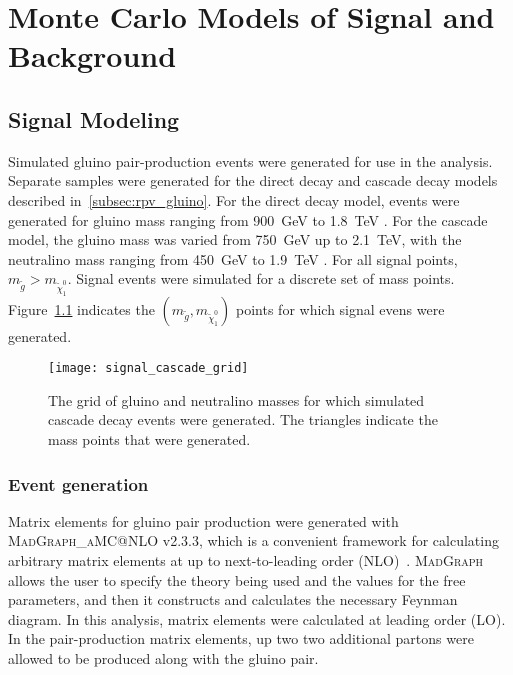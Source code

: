 \chapter{Monte Carlo Models of Signal and Background} \label{ch:monte_carlo}

\section{Signal Modeling}\label{sec:signal_modeling}

Simulated gluino pair-production events were generated for use in the analysis.
Separate samples were generated for the direct decay and cascade decay models described in~\ref{subsec:rpv_gluino}.
For the direct decay model, events were generated for gluino mass ranging from 900~GeV to 1.8~TeV .
For the cascade model, the gluino mass was varied from 750~GeV up to 2.1~TeV, with the neutralino mass ranging from
450~GeV to 1.9~TeV .
For all signal points, $m_{\tilde{g}} > m_{\tilde{\chi}_1^0}$.
Signal events were simulated for a discrete set of mass points.
Figure~\ref{fig:signal_cascade_grid} indicates the $\left(m_{\tilde{g}}, m_{\tilde{\chi}_1^0}\right)$ points for which
signal evens were generated.

\begin{figure}[!ht]
    \centering
\texttt{[image: signal\_cascade\_grid]}
\caption{The grid of gluino and neutralino masses for which simulated cascade decay events were generated. The triangles
indicate the mass points that were generated.}
\label{fig:signal_cascade_grid}
\end{figure}

\subsection{Event generation}\label{subsec:signal_event_gen}

Matrix elements for gluino pair production were generated with \textsc{MadGraph\_aMC@NLO} v2.3.3,
which is a convenient framework for calculating arbitrary matrix elements at up to next-to-leading order (NLO)~\cite{signal-madgraph}.
\textsc{MadGraph} allows the user to specify the theory being used and the values for the free parameters,
and then it constructs and calculates the necessary Feynman diagram.
In this analysis, matrix elements were calculated at leading order (LO).
In the pair-production matrix elements, up two two additional partons were allowed to be produced along with the
gluino pair.

